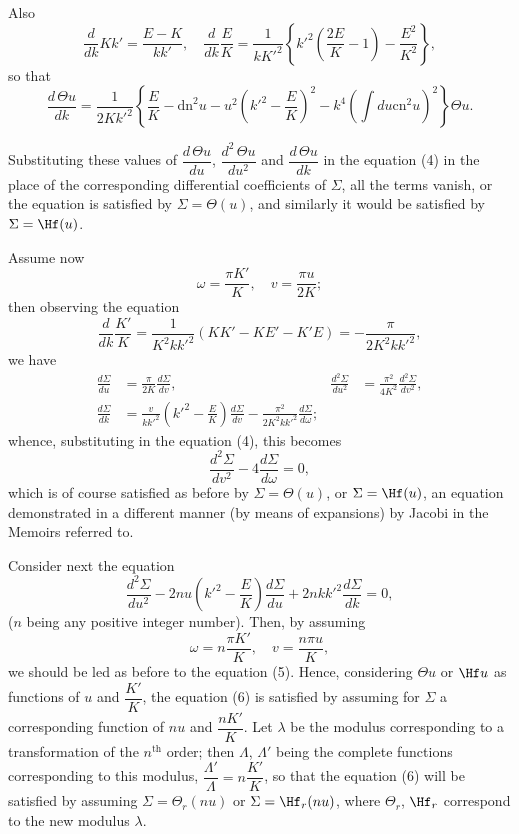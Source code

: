 \documentclass[11pt,a4paper]{book}
\providecommand{\cn}{\mathrm{cn}}
\providecommand{\dn}{\mathrm{dn}}
\begin{document}
Also
\[
\frac{d}{dk} Kk' = \frac{E - K}{kk'}, \quad \frac{d}{dk} \frac{E}{K} = \frac{1}{kK'^2} \left\{k'^2\left(\frac{2E}{K} - 1\right) - \frac{E^2}{K^2}\right\},
\]
so that
\[
\frac{d\, \Theta u}{dk} = \frac{1}{2Kk'^2} \left\{\frac{E}{K} - \dn^2 u - u^2\left(k'^2 - \frac{E}{K}\right)^2 - k^4 (\int du \cn^2 u)^2\right\} \Theta u.
\]


Substituting these values of $\dfrac{d\,\Theta u}{du}$, $\dfrac{d^2\,\Theta u}{du^2}$ and $\dfrac{d\,\Theta u}{dk}$ in the equation (4) in the place of the corresponding differential coefficients of $\Sigma$, all the terms vanish, or the equation is satisfied by $\Sigma = \Theta(u)$, and similarly it would be satisfied by $\Sigma = \Hf(u)$.

Assume now
\[
\omega = \frac{\pi K'}{K}, \quad v = \frac{\pi u}{2K};
\]
then observing the equation
\[
\frac{d}{dk}\frac{K'}{K} = \frac{1}{K^2 k k'^2}(KK' - KE' - K'E) = -\frac{\pi}{2K^2 k k'^2},
\]
we have
\begin{align*}
\frac{d\Sigma}{du} &= \frac{\pi}{2K} \frac{d\Sigma}{dv}, & \frac{d^2\Sigma}{du^2} &= \frac{\pi^2}{4K^2} \frac{d^2\Sigma}{dv^2}, \\
\frac{d\Sigma}{dk} &= \frac{v}{kk'^2}\left(k'^2 - \frac{E}{K}\right) \frac{d\Sigma}{dv} - \frac{\pi^2}{2K^2 k k'^2} \frac{d\Sigma}{d\omega};
\end{align*}
whence, substituting in the equation (4), this becomes
\[
\frac{d^2\Sigma}{dv^2} - 4\frac{d\Sigma}{d\omega} = 0 \tag{5},
\]
which is of course satisfied as before by $\Sigma = \Theta(u)$, or $\Sigma = \Hf(u)$, an equation demonstrated in a different manner (by means of expansions) by Jacobi in the Memoirs referred to.

Consider next the equation
\[
\frac{d^2\Sigma}{du^2} - 2nu\left(k'^2 - \frac{E}{K}\right)\frac{d\Sigma}{du} + 2nkk'^2\frac{d\Sigma}{dk} = 0 \tag{6},
\]
($n$ being any positive integer number). Then, by assuming
\[
\omega = n\frac{\pi K'}{K}, \quad v = \frac{n\pi u}{K},
\]
we should be led as before to the equation (5). Hence, considering $\Theta u$ or $\Hf u$ as functions of $u$ and $\dfrac{K'}{K}$, the equation (6) is satisfied by assuming for $\Sigma$ a corresponding function of $nu$ and $\dfrac{nK'}{K}$. Let $\lambda$ be the modulus corresponding to a transformation of the $n^{\text{th}}$ order; then $\Lambda$, $\Lambda'$ being the complete functions corresponding to this modulus, $\dfrac{\Lambda'}{\Lambda} = n\dfrac{K'}{K}$, so that the equation (6) will be satisfied by assuming $\Sigma = \Theta_r(nu)$ or $\Sigma = \Hf_r(nu)$, where $\Theta_r$, $\Hf_r$ correspond to the new modulus $\lambda$.
\end{document}
